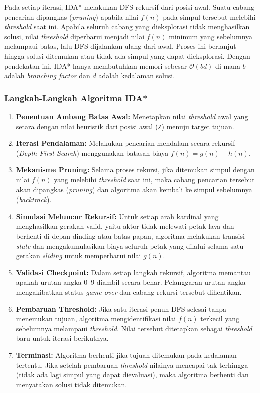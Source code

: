 \documentclass[12pt,a4paper]{article}
\begin{document}
Pada setiap iterasi, IDA* melakukan DFS rekursif dari posisi awal. Suatu cabang
pencarian dipangkas (\textit{pruning}) apabila nilai $f(n)$ pada simpul tersebut
melebihi \textit{threshold} saat ini. Apabila seluruh cabang yang dieksplorasi tidak
menghasilkan solusi, nilai \textit{threshold} diperbarui menjadi nilai $f(n)$ minimum
yang sebelumnya melampaui batas, lalu DFS dijalankan ulang dari awal. Proses ini
berlanjut hingga solusi ditemukan atau tidak ada simpul yang dapat dieksplorasi.
Dengan pendekatan ini, IDA* hanya membutuhkan memori sebesar $\mathcal{O}(bd)$ di
mana $b$ adalah \textit{branching factor} dan $d$ adalah kedalaman solusi.

\subsubsection{Langkah-Langkah Algoritma IDA*}
\begin{enumerate}
\item \textbf{Penentuan Ambang Batas Awal:} Menetapkan nilai \textit{threshold} awal yang setara dengan nilai heuristik dari posisi awal (\texttt{Z}) menuju target tujuan.
\item \textbf{Iterasi Pendalaman:} Melakukan pencarian mendalam secara rekursif (\textit{Depth-First Search}) menggunakan batasan biaya $f(n) = g(n) + h(n)$.
\item \textbf{Mekanisme Pruning:} Selama proses rekursi, jika ditemukan simpul dengan nilai $f(n)$ yang melebihi \textit{threshold} saat ini, maka cabang pencarian tersebut akan dipangkas (\textit{pruning}) dan algoritma akan kembali ke simpul sebelumnya (\textit{backtrack}).
\item \textbf{Simulasi Meluncur Rekursif:} Untuk setiap arah kardinal yang
menghasilkan gerakan valid, yaitu aktor tidak melewati petak lava dan berhenti
di depan dinding atau batas papan, algoritma melakukan transisi \textit{state}
dan mengakumulasikan biaya seluruh petak yang dilalui selama satu gerakan
\textit{sliding} untuk memperbarui nilai $g(n)$.
\item \textbf{Validasi Checkpoint:} Dalam setiap langkah rekursif, algoritma memantau apakah urutan angka 0--9 diambil secara benar. Pelanggaran urutan angka mengakibatkan status \textit{game over} dan cabang rekursi tersebut dihentikan.
\item \textbf{Pembaruan Threshold:} Jika satu iterasi penuh DFS selesai tanpa menemukan tujuan, algoritma mengidentifikasi nilai $f(n)$ terkecil yang sebelumnya melampaui \textit{threshold}. Nilai tersebut ditetapkan sebagai \textit{threshold} baru untuk iterasi berikutnya.
\item \textbf{Terminasi:} Algoritma berhenti jika tujuan ditemukan pada kedalaman tertentu. Jika setelah pembaruan \textit{threshold} nilainya mencapai tak terhingga (tidak ada lagi simpul yang dapat dievaluasi), maka algoritma berhenti dan menyatakan solusi tidak ditemukan.
\end{enumerate}
\end{document}
